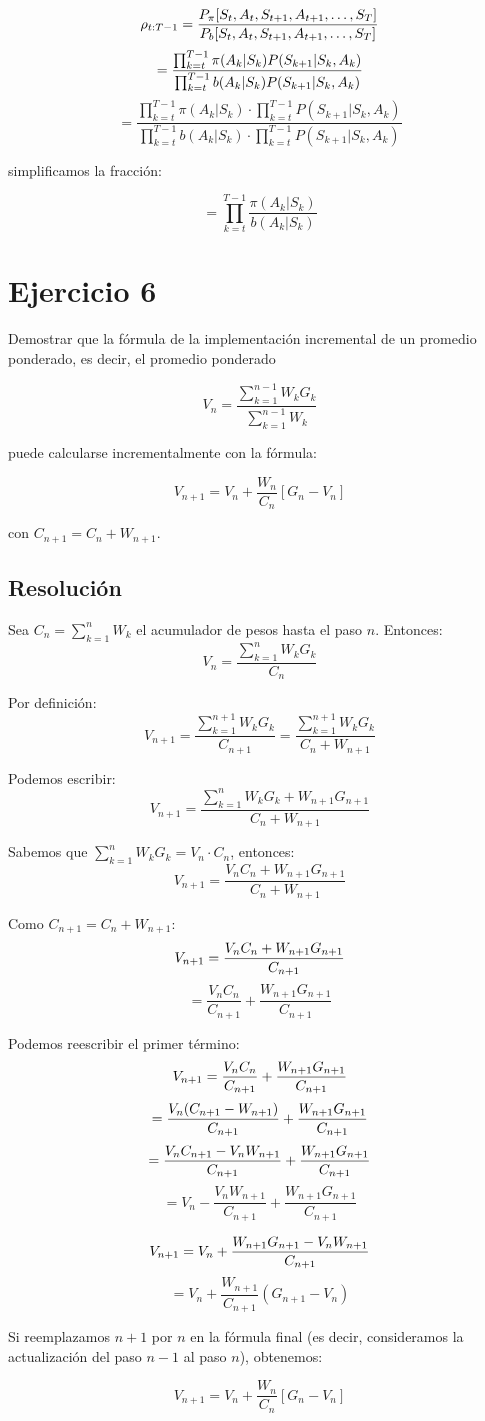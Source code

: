 \documentclass[12pt,a4paper]{article}
\begin{document}
$$\rho_{t:T-1} = \frac{P_{\pi}[S_t, A_t, S_{t+1}, A_{t+1}, \ldots, S_T]}{P_{b}[S_t, A_t, S_{t+1}, A_{t+1}, \ldots, S_T]} \\[10pt]$$
$$= \frac{\prod_{k=t}^{T-1} \pi(A_k|S_k)P(S_{k+1}|S_k, A_k)}{\prod_{k=t}^{T-1} b(A_k|S_k)P(S_{k+1}|S_k, A_k)} \\[10pt]$$
$$= \frac{\prod_{k=t}^{T-1} \pi(A_k|S_k) \cdot \prod_{k=t}^{T-1} P(S_{k+1}|S_k, A_k)}{\prod_{k=t}^{T-1} b(A_k|S_k) \cdot \prod_{k=t}^{T-1} P(S_{k+1}|S_k, A_k)}$$

simplificamos la fracción:

$$= \prod_{k=t}^{T-1} \frac{\pi(A_k|S_k)}{b(A_k|S_k)}$$

\section{Ejercicio 6}

Demostrar que la fórmula de la implementación incremental de un promedio ponderado, es decir,
el promedio ponderado

$$ V_n = \frac{\sum_{k=1}^{n-1} W_k G_k}{\sum_{k=1}^{n-1} W_k} $$

puede calcularse incrementalmente con la fórmula:

$$ V_{n+1} = V_n + \frac{W_n}{C_n}[G_n - V_n] $$

con $C_{n+1} = C_n + W_{n+1}$.

\subsection{Resolución}

Sea $C_n = \sum_{k=1}^{n} W_k$ el acumulador de pesos hasta el paso $n$. Entonces:
$$V_n = \frac{\sum_{k=1}^{n} W_k G_k}{C_n}$$

Por definición:
$$V_{n+1} = \frac{\sum_{k=1}^{n+1} W_k G_k}{C_{n+1}} = \frac{\sum_{k=1}^{n+1} W_k G_k}{C_n + W_{n+1}}$$

Podemos escribir:
$$V_{n+1} = \frac{\sum_{k=1}^{n} W_k G_k + W_{n+1}G_{n+1}}{C_n + W_{n+1}}$$

Sabemos que $\sum_{k=1}^{n} W_k G_k = V_n \cdot C_n$, entonces:
$$V_{n+1} = \frac{V_n C_n + W_{n+1}G_{n+1}}{C_n + W_{n+1}}$$

Como $C_{n+1} = C_n + W_{n+1}$:
$$V_{n+1} = \frac{V_n C_n + W_{n+1}G_{n+1}}{C_{n+1}} \\[8pt]$$
$$= \frac{V_n C_n}{C_{n+1}} + \frac{W_{n+1}G_{n+1}}{C_{n+1}}$$

Podemos reescribir el primer término:
$$V_{n+1} = \frac{V_n C_n}{C_{n+1}} + \frac{W_{n+1}G_{n+1}}{C_{n+1}} \\[8pt]$$
$$= \frac{V_n(C_{n+1} - W_{n+1})}{C_{n+1}} + \frac{W_{n+1}G_{n+1}}{C_{n+1}} \\[8pt]$$
$$= \frac{V_n C_{n+1} - V_n W_{n+1}}{C_{n+1}} + \frac{W_{n+1}G_{n+1}}{C_{n+1}} \\[8pt]$$
$$= V_n - \frac{V_n W_{n+1}}{C_{n+1}} + \frac{W_{n+1}G_{n+1}}{C_{n+1}}$$

$$V_{n+1} = V_n + \frac{W_{n+1}G_{n+1} - V_n W_{n+1}}{C_{n+1}} \\$$
$$= V_n + \frac{W_{n+1}}{C_{n+1}}(G_{n+1} - V_n)$$

Si reemplazamos $n+1$ por $n$ en la fórmula final (es decir, consideramos la actualización del paso $n-1$ al paso $n$), obtenemos:

$$V_{n+1} = V_n + \frac{W_n}{C_n}[G_n - V_n]$$
\end{document}

